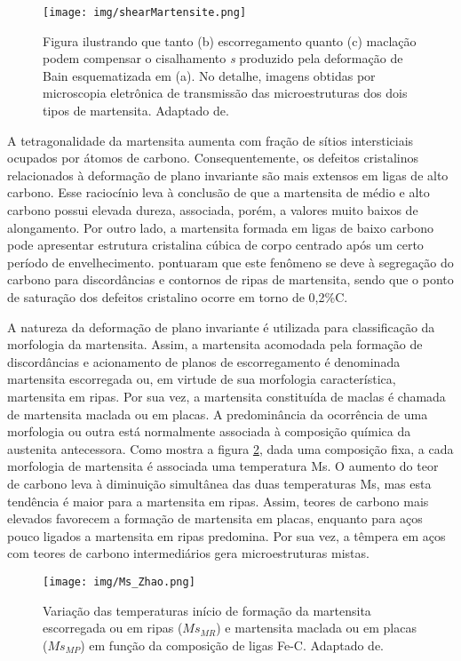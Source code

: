 \begin{figure}
	\texttt{[image: img/shearMartensite.png]}
	\caption{Figura ilustrando que tanto (b) escorregamento quanto (c) maclação podem compensar o cisalhamento \textit{s} produzido pela deformação de Bain esquematizada em (a). No detalhe, imagens obtidas por microscopia eletrônica de transmissão das microestruturas dos dois tipos de martensita. Adaptado de\cite{Porter2009}.}
	\label{fig:cisMartensita}
\end{figure}

A tetragonalidade da martensita aumenta com fração de sítios intersticiais ocupados por átomos de carbono. Consequentemente, os defeitos cristalinos relacionados à deformação de plano invariante são mais extensos em ligas de alto carbono. Esse raciocínio leva à conclusão de que a martensita de médio e alto carbono possui elevada dureza, associada, porém, a valores muito baixos de alongamento. Por outro lado, a martensita formada em ligas de baixo carbono pode apresentar estrutura cristalina cúbica de corpo centrado após um certo período de envelhecimento.  pontuaram que este fenômeno se deve à segregação do carbono para discordâncias e contornos de ripas de martensita, sendo que o ponto de saturação dos defeitos cristalino ocorre em torno de 0,2\%C.

A natureza da deformação de plano invariante é utilizada para classificação da morfologia da martensita. Assim, a martensita acomodada pela formação de discordâncias e acionamento de planos de escorregamento é denominada martensita escorregada ou, em virtude de sua morfologia característica, martensita em ripas. Por sua vez, a martensita constituída de maclas é chamada de martensita maclada ou em placas. A predominância da ocorrência de uma morfologia ou outra está normalmente associada à composição química da austenita antecessora. Como mostra a figura \ref{fig:MsZhaoNotis}, dada uma composição fixa, a cada morfologia de martensita é associada uma temperatura Ms. O aumento do teor de carbono leva à diminuição simultânea das duas temperaturas Ms, mas esta tendência é maior para a martensita em ripas. Assim, teores de carbono mais elevados favorecem a formação de martensita em placas, enquanto para aços pouco ligados a martensita em ripas predomina. Por sua vez, a têmpera em aços com teores de carbono intermediários gera microestruturas mistas.

\begin{figure}
	\texttt{[image: img/Ms\_Zhao.png]}
	\caption{Variação das temperaturas início de formação da martensita escorregada ou em ripas ($Ms_{MR}$) e martensita maclada ou em placas ($Ms_{MP}$) em função da composição de ligas Fe-C. Adaptado de\cite{Zhao1995}.}
	\label{fig:MsZhaoNotis}
\end{figure}

